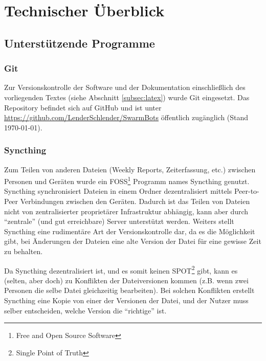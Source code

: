
\chapter{Technischer Überblick}
\label{sec:ueberblick}


\section{Unterstützende Programme}
\label{subsec:ueberblick_programs}

\subsection{Git}
Zur Versionskontrolle der Software und der Dokumentation einschließlich des vorliegenden Textes
(siehe Abschnitt \ref{subsec:latex}) wurde Git eingesetzt.
%
Das Repository befindet sich auf GitHub und ist unter \url{https://github.com/LenderSchlender/SwarmBots} öffentlich zugänglich (Stand \today).

\subsection{Syncthing}
Zum Teilen von anderen Dateien (Weekly Reports, Zeiterfassung, etc.) zwischen Personen und Geräten
wurde ein FOSS\footnote{Free and Open Source Software} Programm names Syncthing \cite{syncthing} genutzt.
%
Syncthing synchronisiert Dateien in einem Ordner dezentralisiert mittels Peer-to-Peer Verbindungen zwischen den Geräten.
%
Dadurch ist das Teilen von Dateien nicht von zentralisierter proprietärer Infrastruktur abhängig,
kann aber durch ``zentrale'' (und gut erreichbare) Server unterstützt werden.
%
Weiters stellt Syncthing eine rudimentäre Art der Versionskontrolle dar,
da es die Möglichkeit gibt,
bei Änderungen der Dateien eine alte Version der Datei für eine gewisse Zeit zu behalten.


Da Syncthing dezentralisiert ist,
und es somit keinen SPOT\footnote{Single Point of Truth} gibt,
kann es (selten, aber doch) zu Konflikten der Dateiversionen kommen (z.B. wenn zwei Personen die selbe Datei gleichzeitig bearbeiten). 
%
Bei solchen Konflikten erstellt Syncthing eine Kopie von einer der Versionen der Datei,
und der Nutzer muss selber entscheiden,
welche Version die ``richtige'' ist.

